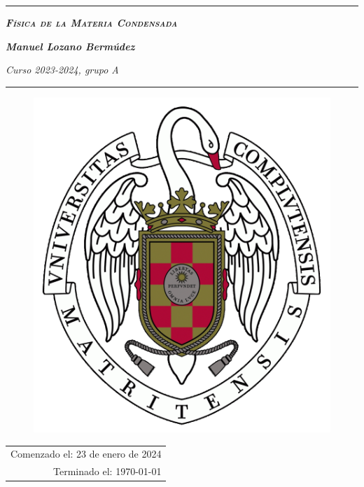 \begin{titlepage}
    \centering\rmfamily
       \vspace*{1cm}
       \noindent\rule{\textwidth}{2.5pt}
        \Huge
       \textbf{\scshape \itshape Física de la Materia Condensada}
       
        \huge
       \vspace{0.5cm}
       \textbf{\itshape Manuel Lozano Bermúdez}

       \Large
       \vspace{0.5 cm}
       \textit{Curso 2023-2024, grupo A}
       
       \noindent\rule{\textwidth}{2.5pt}
        \vspace{1.5 cm}
       \begin{figure}[h]
           \centering
           \includegraphics[scale=.25]{cum.png}
           \label{fig:portada}
       \end{figure}

        \vspace*{\fill}
        \RaggedRight
         \Large
         \begin{tabular}{r}
         Comenzado el: 23 de enero de 2024\\
         Terminado el: \today
         \end{tabular}

\end{titlepage}